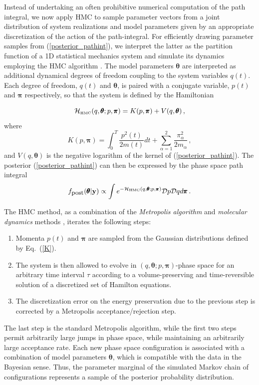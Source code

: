 \documentclass[11pt]{article}
\newcommand{\vc}[1]{{\bf #1 }}
\theoremstyle{definition}
\newcommand{\bt}{\pmb\theta}
\begin{document}
Instead of undertaking an often prohibitive numerical computation of the path integral, we now apply HMC to sample parameter vectors from a joint distribution of system realizations and model parameters given by an appropriate discretization of the action of the path-integral.
For efficiently drawing parameter samples from (\ref{posterior_pathint}), we interpret the latter as the partition function of a 1D statistical mechanics system and simulate its dynamics employing the HMC algorithm \cite{duane_1987}. The model parameters  $\bt$ are interpreted as additional dynamical degrees of freedom coupling to the system variables $q(t)$. Each degree of freedom, $q(t)$ and $\bt$, is paired with a conjugate variable, $p(t)$ and ${\pmb\pi}$ respectively, so that the system is defined by the Hamiltonian

\begin{equation}\label{Hamiltonian}
    \mathcal{H}_{\mbox{\tiny HMC}}(q,\bt; p,{\pmb\pi})
    =
    K( p,{\pmb\pi}) + V( q,\bt)\,,
\end{equation}
where
\begin{equation}\label{K}
   K( p,{\pmb\pi})
   =
   \int_0^T \frac{ p^2(t)}{2m(t)}dt
   + \sum_{\alpha=1}^2\frac{\pi_\alpha^2}{2m_\alpha}\,,
\end{equation}
and $V( q,\bt)$ is the negative logarithm of the kernel of (\ref{posterior_pathint}).
The posterior (\ref{posterior_pathint}) can then
be expressed by the phase space path integral
\begin{equation}\label{phaseSpacePathInt}
    f_{\mbox{\small post}}(\bt | \vc y)
  \propto
  \int
  e^{-\mathcal {H}_{\mbox{\tiny HMC}}(q,\bt; p,{\pmb\pi})}
  {\mathcal Dp}
   {\mathcal Dq}
   d{\pmb\pi}
  \,.
\end{equation}


The HMC method, as a combination of the {\em Metropolis algorithm} \cite{metropolis_1953} and {\em molecular dynamics} methods \cite{alder_1959_MD, rahman_1964_MD}, iterates the following steps:
\begin{enumerate}
  \item
  Momenta $p(t)$ and ${\pmb\pi}$ are sampled from the Gaussian distributions defined by Eq.~(\ref{K}).
  \item
  The system is then allowed to evolve in $\left(q,\bt; p,{\pmb\pi}\right)$-phase space for an arbitrary time interval $\tau$ according to a volume-preserving and time-reversible solution of a discretized set of Hamilton equations.
  \item
  The discretization error on the energy preservation due to the previous step is corrected by a Metropolis acceptance/rejection step.
\end{enumerate}
The last step is the standard Metropolis algorithm, while the first two steps permit arbitrarily large jumps in phase space, while maintaining an arbitrarily large acceptance rate. Each new phase space configuration is associated with a combination of model parameters $\bt$, which is compatible with the data in the Bayesian sense. Thus, the parameter marginal of the simulated Markov chain of configurations represents a sample of the posterior probability distribution.
\end{document}
